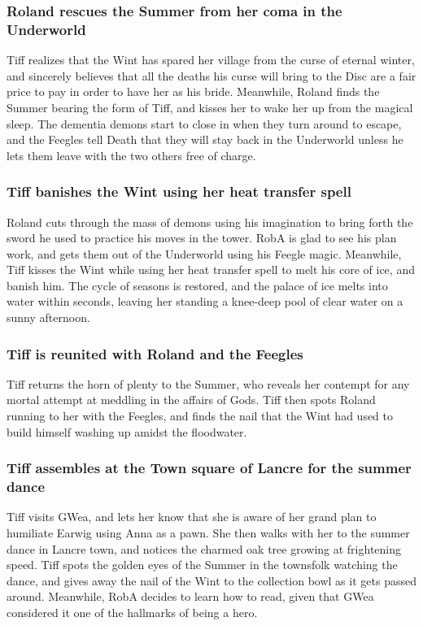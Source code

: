 \subsubsection{\Gls{Roland} rescues the \Gls{Summer} from her coma in the Underworld}
\Gls{Tiff} realizes that the \Gls{Wint} has spared her village from the curse of eternal winter, and
sincerely believes that all the deaths his curse will bring to the Disc are a fair price to pay in
order to have her as his bride. Meanwhile, \Gls{Roland} finds the \Gls{Summer} bearing the form of
\Gls{Tiff}, and kisses her to wake her up from the magical sleep. The dementia demons start to
close in when they turn around to escape, and the Feegles tell \Gls{Death} that they will stay
back in the Underworld unless he lets them leave with the two others free of charge.

\subsubsection{\Gls{Tiff} banishes the \Gls{Wint} using her heat transfer spell}
\Gls{Roland} cuts through the mass of demons using his imagination to bring forth the sword he used
to practice his moves in the tower. \Gls{RobA} is glad to see his plan work, and gets them out of
the Underworld using his Feegle magic. Meanwhile, \Gls{Tiff} kisses the \Gls{Wint} while using her
heat transfer spell to melt his core of ice, and banish him. The cycle of seasons is restored, and
the palace of ice melts into water within seconds, leaving her standing a knee-deep pool of clear
water on a sunny afternoon.

\subsubsection{\Gls{Tiff} is reunited with \Gls{Roland} and the Feegles}
\Gls{Tiff} returns the horn of plenty to the \Gls{Summer}, who reveals her contempt for any mortal
attempt at meddling in the affairs of Gods. \Gls{Tiff} then spots \Gls{Roland} running to her with
the Feegles, and finds the nail that the \Gls{Wint} had used to build himself washing up amidst
the floodwater.

\subsubsection{\Gls{Tiff} assembles at the Town square of Lancre for the summer dance}
\Gls{Tiff} visits \Gls{GWea}, and lets her know that she is aware of her grand plan to humiliate
\Gls{Earwig} using \Gls{Anna} as a pawn. She then walks with her to the summer dance in Lancre
town, and notices the charmed oak tree growing at frightening speed. \Gls{Tiff} spots the golden
eyes of the \Gls{Summer} in the townsfolk watching the dance, and gives away the nail of the
\Gls{Wint} to the collection bowl as it gets passed around. Meanwhile, \Gls{RobA} decides to learn
how to read, given that \Gls{GWea} considered it one of the hallmarks of being a hero.